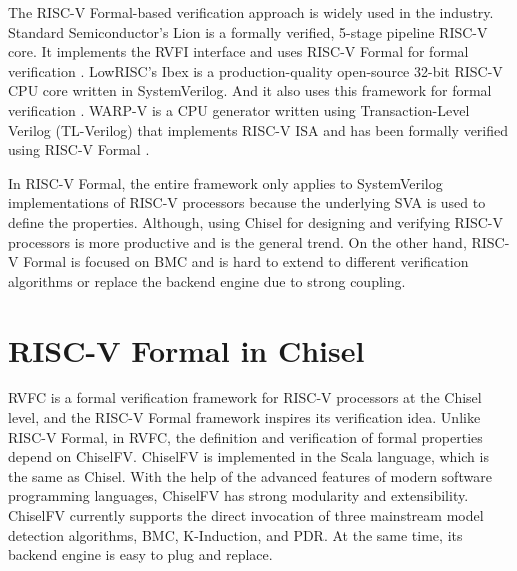 \documentclass[conference]{IEEEtran}
\theoremstyle{definition}
\begin{document}
The RISC-V Formal-based verification approach is widely used in the industry. 
Standard Semiconductor's Lion is a formally verified, 5-stage pipeline RISC-V core.
It implements the RVFI interface and uses RISC-V Formal for formal verification \cite{lion}.
LowRISC's Ibex is a production-quality open-source 32-bit RISC-V CPU core written in SystemVerilog. And it also uses this framework for formal verification \cite{ibex}.
WARP-V is a CPU generator written using Transaction-Level Verilog (TL-Verilog) that implements RISC-V ISA and has been formally verified using RISC-V Formal \cite{hoover2018formally}.

In RISC-V Formal, the entire framework only applies to SystemVerilog implementations of RISC-V processors because the underlying SVA is used to define the properties.
Although, using Chisel for designing and verifying RISC-V processors is more productive and is the general trend.
On the other hand, RISC-V Formal is focused on BMC and is hard to extend to different verification algorithms or replace the backend engine due to strong coupling.

\section{RISC-V Formal in Chisel}

RVFC is a formal verification framework for RISC-V processors at the Chisel level, and the RISC-V Formal framework inspires its verification idea.
Unlike RISC-V Formal, in RVFC, the definition and verification of formal properties depend on ChiselFV.
ChiselFV is implemented in the Scala language, which is the same as Chisel. With the help of the advanced features of modern software programming languages, ChiselFV has strong modularity and extensibility.
ChiselFV currently supports the direct invocation of three mainstream model detection algorithms, BMC, K-Induction, and PDR. At the same time, its backend engine is easy to plug and replace.
\end{document}
